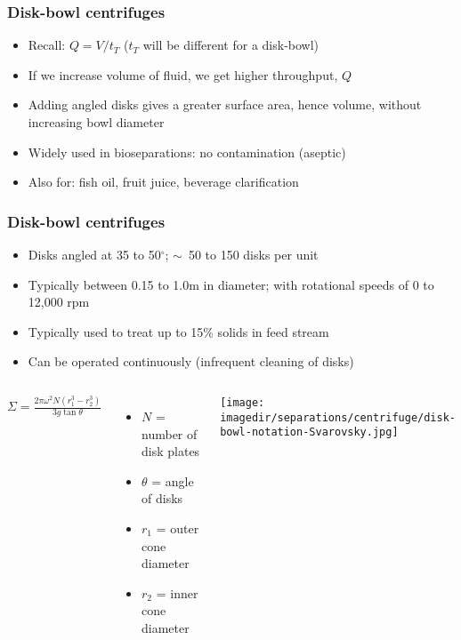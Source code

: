 \begin{frame}\frametitle{Disk-bowl centrifuges}
	\begin{itemize}		
		\item	Recall: $Q = V / t_T$ ($t_T$ will be different for a disk-bowl)
		\item	If we increase volume of fluid, we get higher throughput, $Q$
		\item	Adding angled disks gives a greater surface area, hence volume, without increasing bowl diameter
		\item	Widely used in bioseparations: no contamination (aseptic) 
		\item	Also for: fish oil, fruit juice, beverage clarification
	\end{itemize}
\end{frame}

\begin{frame}\frametitle{Disk-bowl centrifuges}
	\begin{itemize}		
		\item	Disks angled at 35 to 50$^\circ$; $\sim$~50 to 150 disks per unit
		\item	Typically between 0.15 to 1.0m in diameter; with rotational speeds of 0 to 12,000 rpm
		\item	Typically used to treat up to 15\% solids in feed stream
		\item	Can be operated continuously (infrequent cleaning of disks)
	\end{itemize}
	\vspace{-12pt}
	\begin{columns}[c]
			$\Sigma = \displaystyle \frac{2\pi\omega^2 N(r_1^3 - r_2^3)}{3g \tan \theta}$
			\vspace{24pt}
			\begin{itemize}
				\item	$N$ = number of disk plates
				\item	$\theta$ = angle of disks
				\item	$r_1$ = outer cone diameter
				\item	$r_2$ = inner cone diameter
			\end{itemize}
			\begin{center}
				\texttt{[image: \\imagedir/separations/centrifuge/disk-bowl-notation-Svarovsky.jpg]}
			\end{center}
	\end{columns}			
\end{frame}

